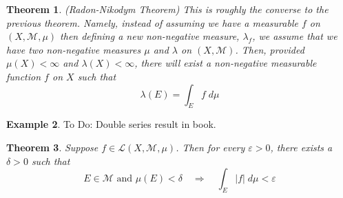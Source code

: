 \documentclass[12pt]{article}
\theoremstyle{plain}
\newtheorem{thm}{Theorem}[subsection]
\theoremstyle{definition}
\newtheorem{ex}[thm]{Example}
\theoremstyle{remark}
\begin{document}
\begin{thm}
\emph{(Radon-Nikodym Theorem)} This is roughly the converse to the previous theorem. Namely, instead of assuming we have a measurable $f$ on $(X,\mathscr{M},\mu)$ then defining a new non-negative measure, $\lambda_f$, we assume that we have two non-negative measures $\mu$ and $\lambda$ on $(X,\mathscr{M})$. Then, provided $\mu(X)<\infty$ and $\lambda(X)<\infty$, there will exist a non-negative measurable function $f$ on $X$ such that
\[
    \lambda(E) = \int_E f \; d\mu
\]
\end{thm}


\begin{ex}
To Do: Double series result in book.
\end{ex}

\begin{thm}
\label{tiny.domain}
Suppose $f\in\mathscr{L}(X,\mathscr{M},\mu)$. Then for every $\varepsilon>0$, there exists a $\delta>0$ such that 
\[
    E\in\mathscr{M}\text{  and  }
    \mu(E)<\delta 
    \quad \Rightarrow\quad
    \int_{E} |f|\; d\mu < \varepsilon
\]
\end{thm}
\end{document}
